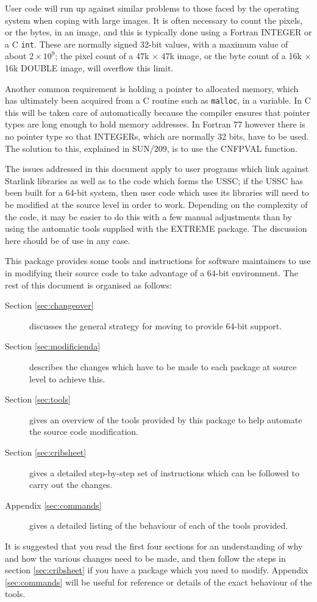 \documentclass[twoside,11pt]{article}
\newcommand{\xref}[3]{#1}
\renewcommand{\_}{\texttt{\symbol{95}}}
\newcommand{\cc}[1]{{\tt #1}}
\begin{document}
User code will run up against similar problems to those faced by
the operating system when coping with large images.
It is often necessary to count the pixels, or the bytes,
in an image, and this is typically done using a Fortran INTEGER
or a C \cc{int}.  These are normally signed 32-bit values, with
a maximum value of about $2 \times 10^9$; the pixel count of a
47k $\times$ 47k image, or the byte count of a 16k $\times$ 16k
\_DOUBLE image, will overflow this limit.

Another common requirement is holding a pointer
to allocated memory, which has ultimately been
acquired from a C routine such as \cc{malloc},
in a variable.
In C this will be taken care of automatically because the compiler
ensures that pointer types are long enough to hold memory addresses.
In Fortran 77 however there is no pointer type so that INTEGERs, which are
normally 32 bits, have to be used.
The solution to this, explained in \xref{SUN/209}{sun209}{pointers},
is to use the \xref{CNF\_PVAL}{sun209}{CNF\_PVAL} function.

The issues addressed in this document apply to user programs which link
against Starlink libraries as well as to the code which forms the USSC;
if the USSC has been built for a 64-bit system, then user code
which uses its libraries will need to be modified at the
source level in order to work.
Depending on the complexity of the code, it may be easier to do this
with a few manual adjustments than by using the automatic
tools supplied with the EXTREME package.
The discussion here should be of use in any case.

This package provides some tools and instructions for
software maintainers to use
in modifying their source code to take advantage of a 64-bit environment.
The rest of this document is organised as follows:
\begin{description}
%
\item[Section \ref{sec:changeover}]
discusses the general strategy for moving to provide 64-bit support.
%
\item[Section \ref{sec:modificienda}]
describes the changes which have to be made to each package at
source level to achieve this.
%
\item[Section \ref{sec:tools}]
gives an overview of the tools provided by this package to help automate
the source code modification.
%
\item[Section \ref{sec:cribsheet}]
gives a detailed step-by-step set of instructions which can be followed
to carry out the changes.
%
\item[Appendix \ref{sec:commands}]
gives a detailed listing of the behaviour of each of the tools provided.
%
\end{description}
It is suggested that you read the first four sections
for an understanding of why and how the various changes need to be
made, and then follow the steps in section \ref{sec:cribsheet}
if you have a package which you need to modify.
Appendix \ref{sec:commands} will be useful for reference or details
of the exact behaviour of the tools.
\end{document}
